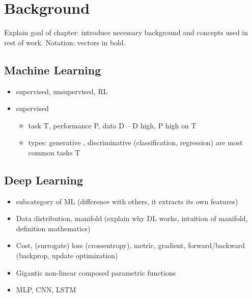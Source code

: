 \chapter{Background} 
\label{chapter-background} 

Explain goal of chapter: introduce necessary background and concepts used in rest of work. Notation: vectors in bold.


\section{Machine Learning}
\begin{itemize}
\item supervised, unsupervised, RL
\item supervised
\begin{itemize}
	\item task T, performance P, data D -- D high, P high on T
	\item types: generative , discriminative (classification, regression) are most common tasks T
\end{itemize}
\end{itemize}

\section{Deep Learning}
\begin{itemize}
\item subcategory of ML (difference with others, it extracts its own features)
\item Data distribution, manifold (explain why DL works, intuition of manifold, definition mathematics)
\item Cost, (surrogate) loss (crossentropy), metric, gradient, forward/backward (backprop, update optimization)
\item Gigantic non-linear composed parametric functions
\item MLP, CNN, LSTM
\end{itemize}


